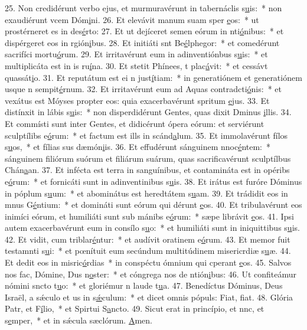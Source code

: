 25. Non credidérunt verbo ejus, et murmuravérunt in tabernáclis s\uline{u}is:~* non exaudiérunt vcem Dóm\uline{i}ni.
26. Et elevávit manum suam sper \uline{e}os:~* ut prostérneret es in des\uline{é}rto:
27. Et ut dejíceret semen eórum in nti\uline{ó}nibus:~* et dispérgeret eos in rgión\uline{i}bus.
28. Et initiáti snt Be\uline{é}lphegor:~* et comedérunt sacrifíci mortu\uline{ó}rum.
29. Et irritavérunt eum in adinventiónbus s\uline{u}is:~* et multiplicáta est in is ru\uline{í}na.
30. Et stetit Phínees, t plac\uline{á}vit:~* et cessávt quassát\uline{i}o.
31. Et reputátum est ei n just\uline{í}tiam:~* in generatiónem et generatiónem usque n sempit\uline{é}rnum.
32. Et irritavérunt eum ad Aquas contradcti\uline{ó}nis:~* et vexátus est Móyses propter eos: quia exacerbavérunt spritum \uline{e}jus.
33. Et distínxit in lábis s\uline{u}is:~* non disperdidérunt Gentes, quas dixit Dminus \uline{i}llis.
34. Et commísti sunt inter Gentes, et didicérunt ópera eórum: et serviérunt sculptílibs e\uline{ó}rum:~* et factum est ills in scánd\uline{a}lum.
35. Et immolavérunt fílos s\uline{u}os,~* et fílias sus dæmón\uline{i}is.
36. Et effudérunt sánguinem nnoc\uline{é}ntem:~* sánguinem filiórum suórum et filiárum suárum, quas sacrificavérunt sculptílbus Chán\uline{a}an.
37. Et infécta est terra in sanguínibus, et contamináta est in opéribs e\uline{ó}rum:~* et fornicáti sunt in adinventinibus s\uline{u}is.
38. Et irátus est furóre Dóminus in póplum s\uline{u}um:~* et abominátus est heredtátem s\uline{u}am.
39. Et trádidit eos in mnus G\uline{é}ntium:~* et domináti sunt eórum qui dérunt \uline{e}os.
40. Et tribulavérunt eos inimíci eórum, et humiliáti sunt sub mánibs e\uline{ó}rum:~* sæpe librávit \uline{e}os.
41. Ipsi autem exacerbavérunt eum in consílo s\uline{u}o:~* et humiliáti sunt in iniquittibus s\uline{u}is.
42. Et vidit, cum triblar\uline{é}ntur:~* et audívit oratinem e\uline{ó}rum.
43. Et memor fuit testamnti s\uline{u}i:~* et pœnítuit eum secúndum multitúdinem misericrdiæ s\uline{u}æ.
44. Et dedit eos in misric\uline{ó}rdias~* in conspéctu ómnium qui cperant \uline{e}os.
45. Salvos nos fac, Dómine, Dus n\uline{o}ster:~* et cóngrega nos de ntión\uline{i}bus:
46. Ut confiteámur nómini sncto t\uline{u}o:~* et gloriémur n laude t\uline{u}a.
47. Benedíctus Dóminus, Deus Israël, a sǽculo et us in s\uline{ǽ}culum:~* et dicet omnis pópuls: Fiat, f\uline{i}at.
48. Glória Patr, et F\uline{í}lio,~* et Spirtui S\uline{a}ncto.
49. Sicut erat in princípio, et nnc, et s\uline{e}mper,~* et in sǽcula sæclórum. \uline{A}men.
